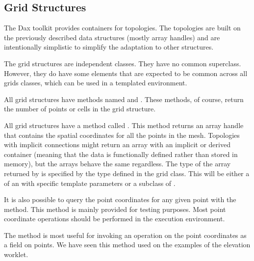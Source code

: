 


\subsection{Grid Structures}
\label{sec:GridStructures}

The Dax toolkit provides containers for topologies. The topologies are
built on the previously described data structures (mostly array handles)
and are intentionally simplistic to simplify the adaptation to other
structures.

The grid structures are independent classes. They have no common
superclass. However, they do have some elements that are expected to be
common across all grids classes, which can be used in a templated
environment.

All grid structures have methods named 
 and 
. These methods, of course, return the number of
points or cells in the grid structure.

 All grid structures have a method called
. This method returns an array handle that
contains the spatial coordinates for all the points in the mesh. Topologies
with implicit connections might return an array with an implicit or derived
container (meaning that the data is functionally defined rather than stored
in memory), but the arrays behave the same regardless. The type of the
array returned by  is specified by the type
 defined in the grid class. This will be
either a  of an  with
specific template parameters or a subclass of
.

 It is also possible to query the point
coordinates for any given point with the 
method. This method is mainly provided for testing purposes. Most point
coordinate operations should be performed in the execution environment.

The  method is most useful for invoking an
operation on the point coordinates as a field on points. We have seen this
method used on the examples of the elevation worklet.

